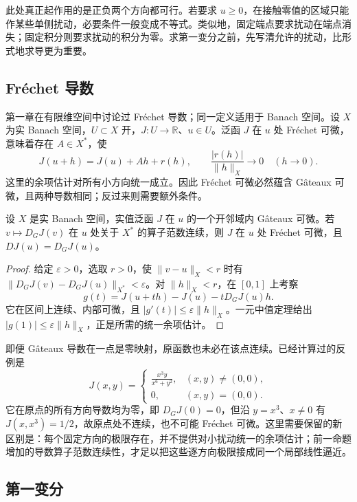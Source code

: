 此处真正起作用的是正负两个方向都可行。若要求 \(u\ge0\)，在接触零值的区域只能作某些单侧扰动，必要条件一般变成不等式。类似地，固定端点要求扰动在端点消失；固定积分则要求扰动的积分为零。求第一变分之前，先写清允许的扰动，比形式地求导更为重要。

\subsection{Fréchet 导数}
\label{b2:subsec:140102}

第一章在有限维空间中讨论过 Fréchet 导数；同一定义适用于 Banach 空间。设 \(X\) 为实 Banach 空间，\(U\subset X\) 开，\(J:U\to\mathbb R\)、\(u\in U\)。泛函 \(J\) 在 \(u\) 处 Fréchet 可微，意味着存在 \(A\in X^*\)，使
\[
 J(u+h)=J(u)+Ah+r(h),\qquad
 \frac{|r(h)|}{\lVert h\rVert_X}\longrightarrow0\quad(h\to0).
\]
这里的余项估计对所有小方向统一成立。因此 Fréchet 可微必然蕴含 Gâteaux 可微，且两种导数相同；反过来则需要额外条件。

\begin{proposition}[导数连续时的统一逼近]
\label{b2:prop:14-continuous-gateaux}
设 \(X\) 是实 Banach 空间，实值泛函 \(J\) 在 \(u\) 的一个开邻域内 Gâteaux 可微。若 \(v\mapsto D_GJ(v)\) 在 \(u\) 处关于 \(X^*\) 的算子范数连续，则 \(J\) 在 \(u\) 处 Fréchet 可微，且 \(DJ(u)=D_GJ(u)\)。
\end{proposition}
\begin{proof}
给定 \(\varepsilon>0\)，选取 \(r>0\)，使 \(\lVert v-u\rVert_X<r\) 时有 \(\lVert D_GJ(v)-D_GJ(u)\rVert_{X^*}<\varepsilon\)。对 \(\lVert h\rVert_X<r\)，在 \([0,1]\) 上考察
\[g(t)=J(u+th)-J(u)-tD_GJ(u)h.\]
它在区间上连续、内部可微，且 \(|g'(t)|\le\varepsilon\lVert h\rVert_X\)。一元中值定理给出 \(|g(1)|\le\varepsilon\lVert h\rVert_X\)，正是所需的统一余项估计。
\end{proof}

即便 Gâteaux 导数在一点是零映射，原函数也未必在该点连续。已经计算过的反例是
\[
 J(x,y)=\begin{cases}\displaystyle\frac{x^3y}{x^6+y^2},&(x,y)\ne(0,0),\\0,&(x,y)=(0,0).\end{cases}
\]
它在原点的所有方向导数均为零，即 \(D_GJ(0)=0\)，但沿 \(y=x^3\)、\(x\ne0\) 有 \(J(x,x^3)=1/2\)，故原点处不连续，也不可能 Fréchet 可微。这里需要保留的新区别是：每个固定方向的极限存在，并不提供对小扰动统一的余项估计；前一命题增加的导数算子范数连续性，才足以把这些逐方向极限接成同一个局部线性逼近。

\subsection{第一变分}
\label{b2:subsec:140103}

